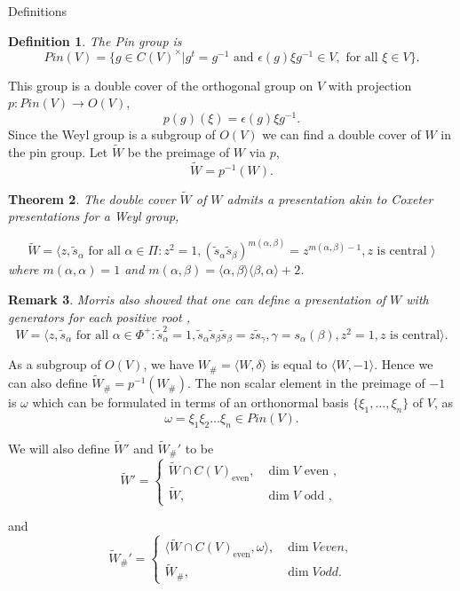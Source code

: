 \documentclass[a4paper,10pt]{amsart}
\newtheorem{theorem}{Theorem}[section]
\newtheorem{definition}[theorem]{Definition}
\newtheorem{remark}[theorem]{Remark}
\DeclareMathOperator{\even}{even}
\begin{document}
\begin{section}{Definitions}
\begin{definition} The Pin group is
$$Pin(V) = \{g\in C(V)^\times | g^t = g^{-1} \text{ and } \epsilon(g) \xi g^{-1} \in V, \text{ for all } \xi \in V\}.$$
\end{definition}
This group is a double cover of the orthogonal group on $V$ with projection $p: Pin(V) \to O(V)$,
$$p(g)(\xi) = \epsilon(g)\xi g^{-1}.$$ 
Since the Weyl group is a subgroup of $O(V)$ we can find a double cover of $W$ in the pin group. Let $\tilde{W}$ be the preimage of $W$ via $p$,
$$\tilde{W} = p^{-1} (W).$$

\begin{theorem}\label{morris} \cite[3.2]{M74} The double cover $\tilde{W}$ of  $W$ admits a presentation akin to Coxeter presentations for a Weyl group,

$$\tilde{W} = \langle z , \tilde{s}_\alpha \text{ for all } \alpha \in \Pi : z^2 = 1, (\tilde{s}_\alpha \tilde{s}_\beta) ^{m(\alpha,\beta)} = z^{m(\alpha,\beta)-1}, z \text{ is central } \rangle$$
where $m(\alpha, \alpha) =1$ and $m(\alpha,\beta) = \langle \alpha , \beta \rangle \langle \beta , \alpha \rangle+ 2$. 
\end{theorem} 

\begin{remark}Morris  also showed that one can define a presentation of $W$ with generators for each positive root \cite[3.2]{M74},
$$W = \langle z , \tilde{s}_\alpha \text{ for all } \alpha \in \Phi^+ : \tilde{s}_\alpha^2 = 1, \tilde{s}_\alpha \tilde{s}_\beta \tilde{s}_\beta = z \tilde{s}_\gamma, \gamma = s_\alpha(\beta), z^2 =1, z \text{ is central}\rangle.$$ \end{remark} 
As a subgroup of $O(V)$, we have $W_\# = \langle W ,\delta\rangle$ is equal to $\langle W, -1\rangle$. Hence we can also define $\tilde{W}_\# = p^{-1}(W_\#)$. The non scalar element in the preimage of $-1$ is $\omega$ which can be formulated in terms of an orthonormal basis $\{\xi_1,\ldots ,\xi_n\}$ of $V$, as 
$$\omega = \xi_1\xi_2\ldots \xi_n \in Pin(V).$$

We will also define $\tilde{W}'$ and $\tilde{W}_\#'$ to be
$$\tilde{W}' = \begin{cases} \tilde{W} \cap C(V)_{\even}, & \dim V \text{ even }, \\ \tilde{W}, &  \dim V \text{ odd },  \end{cases}$$

and
$$\tilde{W}_\#' = \begin{cases} \langle \tilde{W} \cap C(V)_{\even}, \omega \rangle, & \dim V even, \\ \tilde{W}_\#,  & \dim V odd. \end{cases}$$


\end{section}
\end{document}
